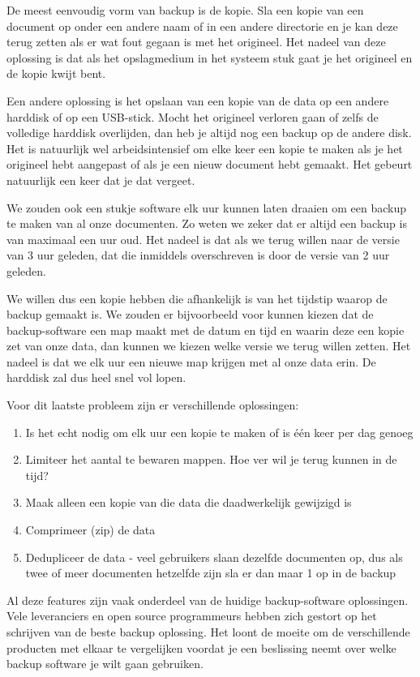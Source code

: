 De meest eenvoudig vorm van backup is de kopie. Sla een kopie van een document op onder een andere naam of in een andere directorie en je kan deze terug zetten als er wat fout gegaan is met het origineel. Het nadeel van deze oplossing is dat als het opslagmedium in het systeem stuk gaat je het origineel en de kopie kwijt bent.

Een andere oplossing is het opslaan van een kopie van de data op een andere harddisk of op een USB-stick. Mocht het origineel verloren gaan of zelfs de volledige harddisk overlijden, dan heb je altijd nog een backup op de andere disk. Het is natuurlijk wel arbeidsintensief om elke keer een kopie te maken als je het origineel hebt aangepast of als je een nieuw document hebt gemaakt. Het gebeurt natuurlijk een keer dat je dat vergeet.

We zouden ook een stukje software elk uur kunnen laten draaien om een backup te maken van al onze documenten. Zo weten we zeker dat er altijd een backup is van maximaal een uur oud. Het nadeel is dat als we terug willen naar de versie van 3 uur geleden, dat die inmiddels overschreven is door de versie van 2 uur geleden.

We willen dus een kopie hebben die afhankelijk is van het tijdstip waarop de backup gemaakt is. We zouden er bijvoorbeeld voor kunnen kiezen dat de backup-software een map maakt met de datum en tijd en waarin deze een kopie zet van onze data, dan kunnen we kiezen welke versie we terug willen zetten. Het nadeel is dat we elk uur een nieuwe map krijgen met al onze data erin. De harddisk zal dus heel snel vol lopen.

Voor dit laatste probleem zijn er verschillende oplossingen:
\begin{enumerate}
\item Is het echt nodig om elk uur een kopie te maken of is \'e\'en keer per dag genoeg
\item Limiteer het aantal te bewaren mappen. Hoe ver wil je terug kunnen in de tijd?
\item Maak alleen een kopie van die data die daadwerkelijk gewijzigd is
\item Comprimeer (zip) de data
\item Dedupliceer de data - veel gebruikers slaan dezelfde documenten op, dus als twee of meer documenten hetzelfde zijn sla er dan maar 1 op in de backup
\end{enumerate}

Al deze features zijn vaak onderdeel van de huidige backup-software oplossingen. Vele leveranciers en open source programmeurs hebben zich gestort op het schrijven van de beste backup oplossing. Het loont de moeite om de verschillende producten met elkaar te vergelijken voordat je een beslissing neemt over welke backup software je wilt gaan gebruiken.


